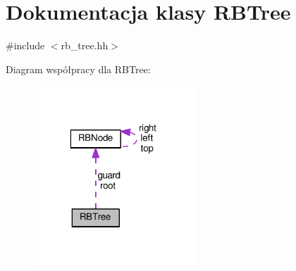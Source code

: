 \hypertarget{class_r_b_tree}{\section{Dokumentacja klasy R\-B\-Tree}
\label{class_r_b_tree}
}


{\ttfamily \#include $<$rb\-\_\-tree.\-hh$>$}



Diagram współpracy dla R\-B\-Tree\-:\nopagebreak
\begin{figure}[H]
\begin{center}
\leavevmode
\includegraphics[width=172pt]{class_r_b_tree__coll__graph}
\end{center}
\end{figure}
